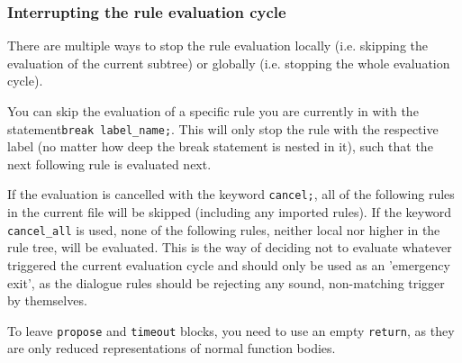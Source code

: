 

\subsubsection{Interrupting the rule evaluation cycle}

%
There are multiple ways to stop the rule evaluation locally (i.e. skipping the evaluation of the current subtree) or globally (i.e. stopping the whole evaluation cycle).

You can skip the evaluation of a specific rule you are currently in with the statement\verb|break label_name;|. This will only stop the rule with the respective label (no matter how deep the break statement is nested in it), such that the next following rule is evaluated next.

%
If the evaluation is cancelled with the keyword \texttt{cancel;}, all of the following rules in the current file will be skipped (including any imported rules). If the keyword \texttt{cancel\_all} is used, none of the following rules, neither local nor higher in the rule tree, will be evaluated. This is the \vonda way of deciding not to evaluate whatever triggered the current evaluation cycle and should only be used as an 'emergency exit', as the dialogue rules should be rejecting any sound, non-matching trigger by themselves.


To leave \texttt{propose} and \texttt{timeout} blocks, you need to use an empty \texttt{return}, as they are only reduced representations of normal function bodies.

